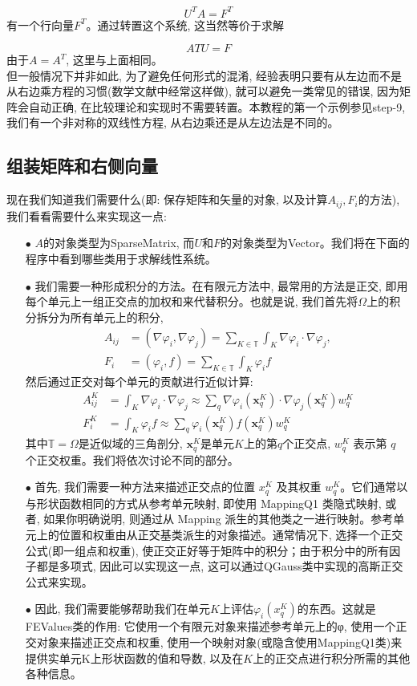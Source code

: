 \documentclass[12pt, a4paper, oneside]{ctexart}
\begin{document}
$$ U^TA=F^T$$
有一个行向量$F^T$。通过转置这个系统, 这当然等价于求解

$$ATU=F$$
由于$A=A^T$, 这里与上面相同。\\
但一般情况下并非如此, 为了避免任何形式的混淆, 经验表明只要有从左边而不是从右边乘方程的习惯(数学文献中经常这样做), 就可以避免一类常见的错误, 因为矩阵会自动正确, 在比较理论和实现时不需要转置。本教程的第一个示例参见step-9, 我们有一个非对称的双线性方程, 从右边乘还是从左边法是不同的。
\subsection{组装矩阵和右侧向量}
现在我们知道我们需要什么(即: 保存矩阵和矢量的对象, 以及计算$A_{ij},F_{i}$的方法), 我们看看需要什么来实现这一点: 
\begin{itemize}
    \item[$\bullet$]$A$的对象类型为SparseMatrix, 而$U$和$F$的对象类型为Vector。我们将在下面的程序中看到哪些类用于求解线性系统。
    \item[$\bullet$]我们需要一种形成积分的方法。在有限元方法中, 最常用的方法是正交, 即用每个单元上一组正交点的加权和来代替积分。也就是说, 我们首先将$\Omega$上的积分拆分为所有单元上的积分,
    $$
    \begin{aligned}
    A_{i j} & =\left(\nabla \varphi_i, \nabla \varphi_j\right)=\sum_{K \in \mathbb{T}} \int_K \nabla \varphi_i \cdot \nabla \varphi_j, \\
    F_i & =\left(\varphi_i, f\right)=\sum_{K \in \mathbb{T}} \int_K \varphi_i f
    \end{aligned}
    $$
    然后通过正交对每个单元的贡献进行近似计算: 
    $$
    \begin{aligned}
    A_{i j}^K & =\int_K \nabla \varphi_i \cdot \nabla \varphi_j \approx \sum_q \nabla \varphi_i\left(\mathbf{x}_q^K\right) \cdot \nabla \varphi_j\left(\mathbf{x}_q^K\right) w_q^K \\
    F_i^K & =\int_K \varphi_i f \approx \sum_q \varphi_i\left(\mathbf{x}_q^K\right) f\left(\mathbf{x}_q^K\right) w_q^K
    \end{aligned}
    $$
    其中$\mathbb{T}=\Omega$是近似域的三角剖分, $\mathbf{x}_q^K$是单元$K$上的第$q$个正交点, $w_q^K$ 表示第 $q$ 个正交权重。我们将依次讨论不同的部分。
    \item[$\bullet$]首先, 我们需要一种方法来描述正交点的位置 $x_q^K$ 及其权重 $w_q^K$。它们通常以与形状函数相同的方式从参考单元映射, 即使用 MappingQ1 类隐式映射, 或者, 如果你明确说明, 则通过从 Mapping 派生的其他类之一进行映射。参考单元上的位置和权重由从正交基类派生的对象描述。通常情况下, 选择一个正交公式(即一组点和权重), 使正交正好等于矩阵中的积分；由于积分中的所有因子都是多项式, 因此可以实现这一点, 这可以通过QGauss类中实现的高斯正交公式来实现。
    \item[$\bullet$]因此, 我们需要能够帮助我们在单元$K$上评估$\varphi_i(x_q^K)$的东西。这就是FEValues类的作用: 它使用一个有限元对象来描述参考单元上的φ, 使用一个正交对象来描述正交点和权重, 使用一个映射对象(或隐含使用MappingQ1类)来提供实单元K上形状函数的值和导数, 以及在$K$上的正交点进行积分所需的其他各种信息。
    

\end{itemize}
\end{document}
